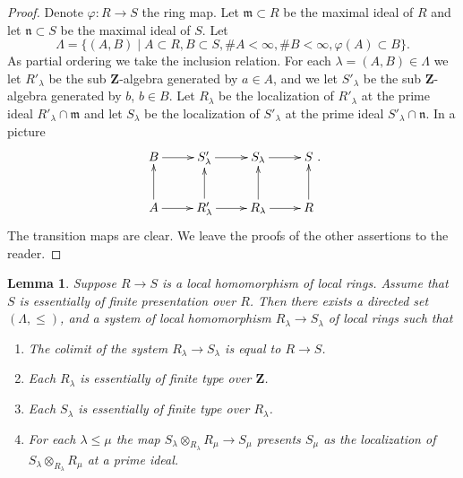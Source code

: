 \documentclass{amsart}
\theoremstyle{plain}
\newtheorem{lemma}[subsection]{Lemma}
\theoremstyle{definition}
\theoremstyle{remark}
\numberwithin{equation}{subsection}
\begin{document}
\begin{proof}
Denote $\varphi : R  \to S$ the ring map.
Let $\mathfrak m \subset R$ be the maximal ideal
of $R$ and let $\mathfrak n \subset S$ be the maximal
ideal of $S$. Let
$$
\Lambda = \{
(A, B)
\mid
A \subset R, B \subset S, \# A < \infty, \# B < \infty, \varphi(A) \subset B
\}.
$$
As partial ordering we take the inclusion relation. For each
$\lambda = (A, B) \in \Lambda$ we let $R'_\lambda$ be
the sub $\mathbf{Z}$-algebra generated by
$a \in A$, and we let $S'_\lambda$ be the sub
$\mathbf{Z}$-algebra generated by $b$, $b \in B$.
Let $R_\lambda$ be the localization of $R'_\lambda$
at the prime ideal $R'_\lambda \cap \mathfrak m$ and let
$S_\lambda$ be the localization of $S'_\lambda$ at
the prime ideal $S'_\lambda \cap \mathfrak n$.
In a picture
$$
\xymatrix{
B \ar[r] &
S'_\lambda \ar[r] &
S_\lambda \ar[r] &
S \\
A \ar[r] \ar[u] &
R'_\lambda \ar[r] \ar[u] &
R_\lambda \ar[r] \ar[u] &
R \ar[u]
}.
$$
The transition maps are clear. We leave the proofs of the other
assertions to the reader.
\end{proof}


\begin{lemma}
\label{lemma-limit-essentially-finite-presentation}
Suppose $R \to S$ is a local homomorphism of local rings.
Assume that $S$ is essentially of finite presentation over $R$.
Then there exists a directed set $(\Lambda, \leq)$, and
a system of local homomorphism $R_\lambda \to S_\lambda$
of local rings such that
\begin{enumerate}
\item The colimit of the system $R_\lambda \to S_\lambda$
is equal to $R \to S$.
\item Each $R_\lambda$ is essentially of finite type
over $\mathbf{Z}$.
\item Each $S_\lambda$ is essentially of finite type
over $R_\lambda$.
\item For each $\lambda \leq \mu$ the map
$S_\lambda \otimes_{R_\lambda} R_\mu \to S_\mu$
presents $S_\mu$ as the localization of
$S_\lambda \otimes_{R_\lambda} R_\mu$
at a prime ideal.
\end{enumerate}
\end{lemma}
\end{document}
